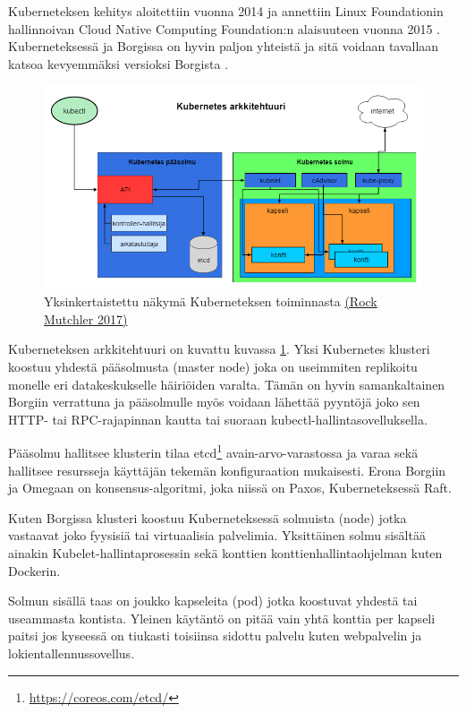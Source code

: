 \documentclass[finnish,gradu]{tktltiki3}
\begin{document}
Kuberneteksen kehitys aloitettiin vuonna 2014 ja annettiin Linux Foundationin hallinnoivan Cloud Native Computing Foundation:n alaisuuteen vuonna 2015 \cite{tc-kubernetes-cncf}. Kuberneteksessä ja Borgissa on hyvin paljon yhteistä ja sitä voidaan tavallaan katsoa kevyemmäksi versioksi Borgista \cite{borg-goto-youtube}.

\begin{figure}[h]
    \centering
    \includegraphics[width=1\textwidth]{images/kubernetes-2.png}
    \caption{Yksinkertaistettu näkymä Kuberneteksen toiminnasta \href{https://www.youtube.com/watch?v=YKg7uNMy_rc}{(Rock Mutchler 2017)}}
    \label{fig:kubernetes}
\end{figure}

Kuberneteksen arkkitehtuuri on kuvattu kuvassa \ref{fig:kubernetes}. Yksi Kubernetes klusteri koostuu yhdestä pääsolmusta (master node) joka on useimmiten replikoitu monelle eri datakeskukselle häiriöiden varalta. Tämän on hyvin samankaltainen Borgiin verrattuna ja pääsolmulle myös voidaan lähettää pyyntöjä joko sen HTTP- tai RPC-rajapinnan kautta tai suoraan kubectl-hallintasovelluksella.

Pääsolmu hallitsee klusterin tilaa etcd\footnote{\url{https://coreos.com/etcd/}} avain-arvo-varastossa ja varaa sekä hallitsee resursseja käyttäjän tekemän konfiguraation mukaisesti. Erona Borgiin ja Omegaan on konsensus-algoritmi, joka niissä on Paxos, Kuberneteksessä Raft.

Kuten Borgissa klusteri koostuu Kuberneteksessä solmuista (node) jotka vastaavat joko fyysisiä tai virtuaalisia palvelimia. Yksittäinen solmu sisältää ainakin Kubelet-hallintaprosessin sekä konttien konttienhallintaohjelman kuten Dockerin.

Solmun sisällä taas on joukko kapseleita (pod) jotka koostuvat yhdestä tai useammasta kontista. Yleinen käytäntö on pitää vain yhtä konttia per kapseli paitsi jos kyseessä on tiukasti toisiinsa sidottu palvelu kuten webpalvelin ja lokientallennussovellus.
\end{document}
